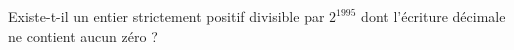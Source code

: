 Existe-t-il un entier strictement positif divisible par $2^{1995}$ dont l'écriture décimale ne contient aucun zéro ?

